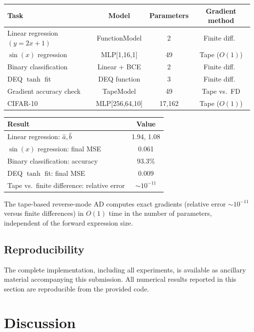 \documentclass{lmcs}
\theoremstyle{plain}
\theoremstyle{definition}
\begin{document}
\begin{center}
\begin{tabular}{l c c c}
\toprule
Task & Model & Parameters & Gradient method \\
\midrule
Linear regression $(y = 2x + 1)$ &
  FunctionModel & 2 & Finite diff.\ \\
$\sin(x)$ regression &
  MLP[1,16,1] & 49 & Tape ($O(1)$) \\
Binary classification &
  Linear + BCE & 2 & Finite diff.\ \\
DEQ $\tanh$ fit &
  DEQ function & 3 & Finite diff.\ \\
Gradient accuracy check &
  TapeModel & 49 & Tape vs.\ FD \\
CIFAR-10 &
  MLP[256,64,10] & 17,162 & Tape ($O(1)$) \\
\bottomrule
\end{tabular}
\end{center}

\begin{center}
\begin{tabular}{l c}
\toprule
Result & Value \\
\midrule
Linear regression: $\hat{a}, \hat{b}$ & 1.94, 1.08 \\
$\sin(x)$ regression: final MSE & 0.061 \\
Binary classification: accuracy & 93.3\% \\
DEQ $\tanh$ fit: final MSE & 0.009 \\
Tape vs.\ finite difference: relative error & $\sim 10^{-11}$ \\
\bottomrule
\end{tabular}
\end{center}

The tape-based reverse-mode AD computes exact gradients (relative error
$\sim 10^{-11}$ versus finite differences) in $O(1)$ time in the number of
parameters, independent of the forward expression size.

\subsection{Reproducibility}

The complete implementation, including all experiments, is available as
ancillary material accompanying this submission. All numerical results
reported in this section are reproducible from the provided code.

\section{Discussion}\label{sec:discussion}
\end{document}
